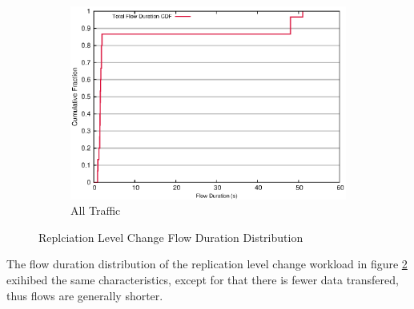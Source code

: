 \begin{figure}[!htbp]
\begin{subfigure}[b]{.55\linewidth}
	\includegraphics[width=.99\textwidth]{figures/replica_change/flow_duration.eps}
	\caption{All Traffic}\label{fig:read_duration:all}
   \end{subfigure}%
\caption{Replciation Level Change Flow Duration Distribution}
\label{fig:replica_duration}
\end{figure}

The flow duration distribution of the replication level change workload in figure \ref{fig:replica_duration} exihibed the same characteristics, except for that there is fewer data transfered, thus flows are generally shorter. 


